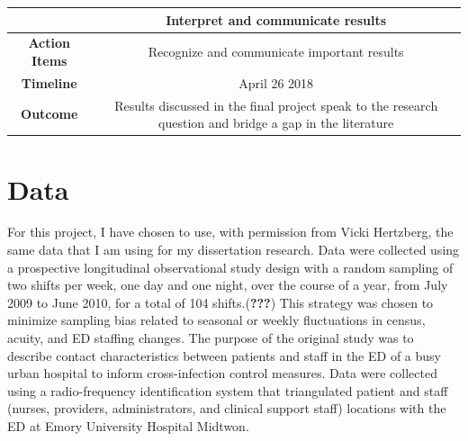 \documentclass[]{elsarticle} %
\begin{document}
\begin{longtable}[]{@{}cc@{}}
\toprule
\begin{minipage}[b]{0.25\columnwidth}\centering\strut
~\strut
\end{minipage} & \begin{minipage}[b]{0.42\columnwidth}\centering\strut
Interpret and communicate results\strut
\end{minipage}\tabularnewline
\midrule
\endhead
\begin{minipage}[t]{0.25\columnwidth}\centering\strut
\textbf{Action Items}\strut
\end{minipage} & \begin{minipage}[t]{0.42\columnwidth}\centering\strut
Recognize and communicate important results\strut
\end{minipage}\tabularnewline
\begin{minipage}[t]{0.25\columnwidth}\centering\strut
\textbf{Timeline}\strut
\end{minipage} & \begin{minipage}[t]{0.42\columnwidth}\centering\strut
April 26 2018\strut
\end{minipage}\tabularnewline
\begin{minipage}[t]{0.25\columnwidth}\centering\strut
\textbf{Outcome}\strut
\end{minipage} & \begin{minipage}[t]{0.42\columnwidth}\centering\strut
Results discussed in the final project speak to the research question
and bridge a gap in the literature\strut
\end{minipage}\tabularnewline
\bottomrule
\end{longtable}

\section{Data}\label{data}

For this project, I have chosen to use, with permission from Vicki
Hertzberg, the same data that I am using for my dissertation research.
Data were collected using a prospective longitudinal observational study
design with a random sampling of two shifts per week, one day and one
night, over the course of a year, from July 2009 to June 2010, for a
total of 104 shifts.({\textbf{???}}) This strategy was chosen to
minimize sampling bias related to seasonal or weekly fluctuations in
census, acuity, and ED staffing changes. The purpose of the original
study was to describe contact characteristics between patients and staff
in the ED of a busy urban hospital to inform cross-infection control
measures. Data were collected using a radio-frequency identification
system that triangulated patient and staff (nurses, providers,
administrators, and clinical support staff) locations with the ED at
Emory University Hospital Midtwon.
\end{document}

